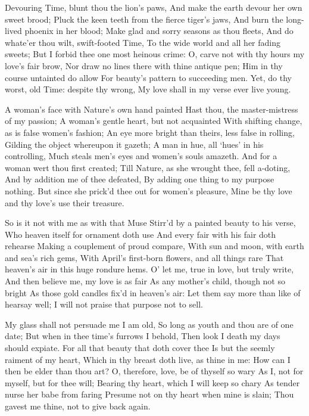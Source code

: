 \documentclass[twocolumn]{book}
\begin{document}
Devouring Time, blunt thou the lion's paws,
And make the earth devour her own sweet brood;
Pluck the keen teeth from the fierce tiger's jaws,
And burn the long-lived phoenix in her blood;
\numerus*{}Make glad and sorry seasons as thou fleets,
And do whate'er thou wilt, swift-footed Time,
To the wide world and all her fading sweets;
But I forbid thee one most heinous crime:
O, carve not with thy hours my love's fair brow,
Nor draw no lines there with thine antique pen;
Him in thy course untainted do allow
For beauty's pattern to succeeding men.
  Yet, do thy worst, old Time: despite thy wrong,
  My love shall in my verse ever live young.


A woman's face with Nature's own hand painted
Hast thou, the master-mistress of my passion;
A woman's gentle heart, but not acquainted
With shifting change, as is false women's fashion;
An eye more bright than theirs, less false in rolling,
Gilding the object whereupon it gazeth;
A man in hue, all `hues' in his controlling,
Much steals men's eyes and women's souls amazeth.
And for a woman wert thou first created;
Till Nature, as she wrought thee, fell a-doting,
And by addition me of thee defeated,
By adding one thing to my purpose nothing.
  But since she prick'd thee out for women's pleasure,
  Mine be thy love and thy love's use their treasure.


So is it not with me as with that Muse
Stirr'd by a painted beauty to his verse,
Who heaven itself for ornament doth use
And every fair with his fair doth rehearse
Making a couplement of proud compare,
With sun and moon, with earth and sea's rich gems,
With April's first-born flowers, and all things rare
That heaven's air in this huge rondure hems.
O' let me, true in love, but truly write,
And then believe me, my love is as fair
As any mother's child, though not so bright
As those gold candles fix'd in heaven's air:
  Let them say more than like of hearsay well;
  I will not praise that purpose not to sell.

My glass shall not persuade me I am old,
So long as youth and thou are of one date;
But when in thee time's furrows I behold,
Then look I death my days should expiate.
For all that beauty that doth cover thee
Is but the seemly raiment of my heart,
Which in thy breast doth live, as thine in me:
How can I then be elder than thou art?
O, therefore, love, be of thyself so wary
As I, not for myself, but for thee will;
Bearing thy heart, which I will keep so chary
As tender nurse her babe from faring
  Presume not on thy heart when mine is slain;
  Thou gavest me thine, not to give back again.
\end{document}
